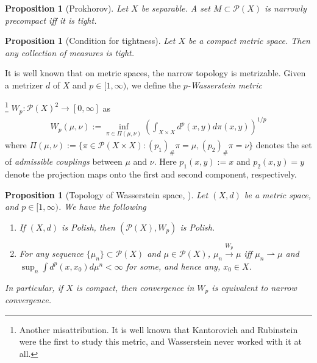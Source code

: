 \documentclass{article}
\newcommand{\narrowto}{\rightharpoonup}
\newcommand{\Pcal}{\mathcal{P}}
\newtheorem{prop}[theorem]{Proposition}
\theoremstyle{definition}
\begin{document}
\begin{prop}[Prokhorov]
Let $X$ be separable. A set $M\subset \Pcal(X)$ is narrowly precompact iff it is tight. 
\end{prop}

\begin{prop}[Condition for tightness]
Let $X$ be a compact metric space. Then any collection of measures is tight. 
\end{prop}
It is well known that on metric spaces, the narrow topology is metrizable. Given a metrizer $d$ of $X$ and $p\in [1, \infty)$, we define the {\it $p$-Wasserstein metric}{\footnote{Another misattribution. It is well known that Kantorovich and Rubinstein were the first to study this metric, and Wasserstein never worked with it at all.} $W_p:\Pcal(X)^2\to [0,\infty]$ as 
\begin{align}\label{W_Pdefn}
W_p(\mu,\nu):= \inf_{\pi\in\Pi(\mu,\nu)} \left(\int_{X\times X}d^p(x,y)d\pi(x,y)\right)^{1/p} 
\end{align}
 where $\Pi(\mu,\nu):= \{\pi\in \Pcal(X\times X): (p_1)_\#\pi=\mu, (p_2)_\#\pi=\nu\}$ denotes the set of {\it admissible couplings} between $\mu$ and $\nu$. Here $p_1(x,y):=x$ and  $p_2(x,y)=y$ denote the projection maps onto the first and second component, respectively. 
 \begin{prop}[Topology of Wasserstein space, ]
 Let $(X,d)$ be a metric space, and $p\in [1,\infty)$. We have the following 
 \begin{enumerate}
 \item If $(X,d)$ is Polish, then $(\Pcal(X),W_p)$ is Polish. 
 \item For any sequence $\{\mu_n\}\subset \Pcal(X)$ and $\mu\in \Pcal(X)$, $\mu_n\xrightarrow{W_p}\mu$ iff $\mu_n\narrowto \mu$ and ${\sup_n\int d^p(x,x_0)d\mu^n<\infty}$ for some, and hence any, $x_0\in X$. 


 \end{enumerate}
 In particular, if $X$ is compact, then convergence in $W_p$ is equivalent to narrow convergence. 
 \end{prop}
}
\end{document}
